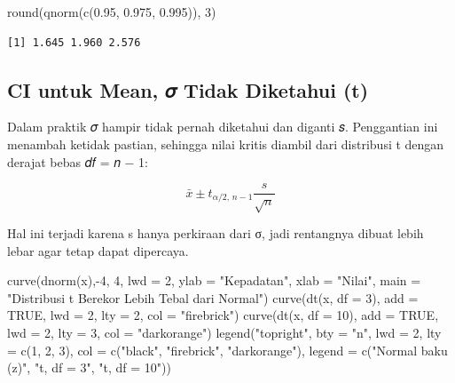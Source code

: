 \documentclass[
  indonesian,
  letterpaper,
]{book}
\newenvironment{Shaded}{\begin{snugshade}}{\end{snugshade}}
\newcommand{\AttributeTok}[1]{\textcolor[rgb]{0.40,0.45,0.13}{#1}}
\newcommand{\ConstantTok}[1]{\textcolor[rgb]{0.56,0.35,0.01}{#1}}
\newcommand{\DecValTok}[1]{\textcolor[rgb]{0.68,0.00,0.00}{#1}}
\newcommand{\FloatTok}[1]{\textcolor[rgb]{0.68,0.00,0.00}{#1}}
\newcommand{\FunctionTok}[1]{\textcolor[rgb]{0.28,0.35,0.67}{#1}}
\newcommand{\NormalTok}[1]{\textcolor[rgb]{0.00,0.23,0.31}{#1}}
\newcommand{\SpecialCharTok}[1]{\textcolor[rgb]{0.37,0.37,0.37}{#1}}
\newcommand{\StringTok}[1]{\textcolor[rgb]{0.13,0.47,0.30}{#1}}
\begin{document}
\begin{Shaded}
\begin{Highlighting}[]
\FunctionTok{round}\NormalTok{(}\FunctionTok{qnorm}\NormalTok{(}\FunctionTok{c}\NormalTok{(}\FloatTok{0.95}\NormalTok{, }\FloatTok{0.975}\NormalTok{, }\FloatTok{0.995}\NormalTok{)), }\DecValTok{3}\NormalTok{)}
\end{Highlighting}
\end{Shaded}

\begin{verbatim}
[1] 1.645 1.960 2.576
\end{verbatim}

\subsection{CI untuk Mean, 𝜎 Tidak Diketahui
(t)}\label{ci-untuk-mean-ux1d70e-tidak-diketahui-t}

Dalam praktik 𝜎 hampir tidak pernah diketahui dan diganti 𝑠. Penggantian
ini menambah ketidak pastian, sehingga nilai kritis diambil dari
distribusi t dengan derajat bebas 𝑑𝑓 = 𝑛 − 1:

\[\bar{x} \pm t_{\alpha/2,\, n-1} \frac{s}{\sqrt{n}}\]

Hal ini terjadi karena s hanya perkiraan dari σ, jadi rentangnya dibuat
lebih lebar agar tetap dapat dipercaya.

\begin{Shaded}
\begin{Highlighting}[]
\FunctionTok{curve}\NormalTok{(}\FunctionTok{dnorm}\NormalTok{(x),}\SpecialCharTok{{-}}\DecValTok{4}\NormalTok{, }\DecValTok{4}\NormalTok{, }\AttributeTok{lwd =} \DecValTok{2}\NormalTok{, }\AttributeTok{ylab =} \StringTok{"Kepadatan"}\NormalTok{, }\AttributeTok{xlab =} \StringTok{"Nilai"}\NormalTok{,}
\AttributeTok{main =} \StringTok{"Distribusi t Berekor Lebih Tebal dari Normal"}\NormalTok{)}
\FunctionTok{curve}\NormalTok{(}\FunctionTok{dt}\NormalTok{(x, }\AttributeTok{df =} \DecValTok{3}\NormalTok{), }\AttributeTok{add =} \ConstantTok{TRUE}\NormalTok{, }\AttributeTok{lwd =} \DecValTok{2}\NormalTok{, }\AttributeTok{lty =} \DecValTok{2}\NormalTok{, }\AttributeTok{col =} \StringTok{"firebrick"}\NormalTok{)}
\FunctionTok{curve}\NormalTok{(}\FunctionTok{dt}\NormalTok{(x, }\AttributeTok{df =} \DecValTok{10}\NormalTok{), }\AttributeTok{add =} \ConstantTok{TRUE}\NormalTok{, }\AttributeTok{lwd =} \DecValTok{2}\NormalTok{, }\AttributeTok{lty =} \DecValTok{3}\NormalTok{, }\AttributeTok{col =} \StringTok{"darkorange"}\NormalTok{)}
\FunctionTok{legend}\NormalTok{(}\StringTok{"topright"}\NormalTok{, }\AttributeTok{bty =} \StringTok{"n"}\NormalTok{, }\AttributeTok{lwd =} \DecValTok{2}\NormalTok{, }\AttributeTok{lty =} \FunctionTok{c}\NormalTok{(}\DecValTok{1}\NormalTok{, }\DecValTok{2}\NormalTok{, }\DecValTok{3}\NormalTok{), }\AttributeTok{col =} \FunctionTok{c}\NormalTok{(}\StringTok{"black"}\NormalTok{,}
\StringTok{"firebrick"}\NormalTok{, }\StringTok{"darkorange"}\NormalTok{),}
\AttributeTok{legend =} \FunctionTok{c}\NormalTok{(}\StringTok{"Normal baku (z)"}\NormalTok{, }\StringTok{"t, df = 3"}\NormalTok{, }\StringTok{"t, df = 10"}\NormalTok{))}
\end{Highlighting}
\end{Shaded}
\end{document}

